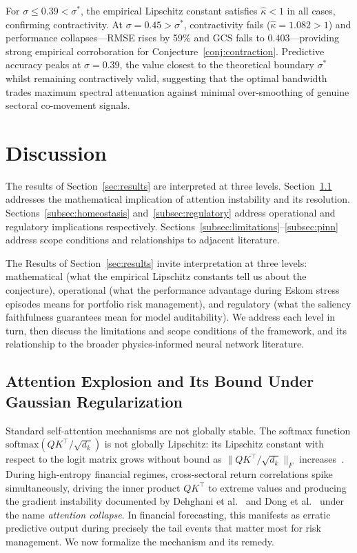 \documentclass[11pt,a4paper]{article}  %
\theoremstyle{plain}
\theoremstyle{definition}
\theoremstyle{remark}
\begin{document}
For $\sigma \leq 0.39 < \sigma^*$, the empirical Lipschitz constant
satisfies $\hat{\kappa} < 1$ in all cases, confirming contractivity.
At $\sigma = 0.45 > \sigma^*$, contractivity fails ($\hat{\kappa} =
1.082 > 1$) and performance collapses---RMSE rises by 59\% and GCS
falls to $0.403$---providing strong empirical corroboration for
Conjecture~\ref{conj:contraction}. Predictive accuracy peaks at
$\sigma = 0.39$, the value closest to the theoretical boundary
$\sigma^*$ whilst remaining contractively valid, suggesting that
the optimal bandwidth trades maximum spectral attenuation against
minimal over-smoothing of genuine sectoral co-movement signals.


\section{Discussion}
\label{sec:discussion}

The results of Section~\ref{sec:results} are interpreted at three
levels. Section~\ref{subsec:fallacy} addresses the mathematical
implication of attention instability and its resolution.
Sections~\ref{subsec:homeostasis} and~\ref{subsec:regulatory}
address operational and regulatory implications respectively.
Sections~\ref{subsec:limitations}--\ref{subsec:pinn} address
scope conditions and relationships to adjacent literature.

The Results of Section~\ref{sec:results} invite interpretation
at three levels: mathematical (what the empirical Lipschitz
constants tell us about the conjecture), operational (what the
performance advantage during Eskom stress episodes means for
portfolio risk management), and regulatory (what the saliency
faithfulness guarantees mean for model auditability). We address
each level in turn, then discuss the limitations and scope
conditions of the framework, and its relationship to the broader
physics-informed neural network literature.

\subsection{Attention Explosion and Its Bound Under Gaussian Regularization}
\label{subsec:fallacy}

Standard self-attention mechanisms are not globally stable. The
softmax function $\mathrm{softmax}(QK^{\top}/\sqrt{d_k})$ is not
globally Lipschitz: its Lipschitz constant with respect to the logit
matrix grows without bound as $\|\!QK^{\top}/\!\sqrt{d_k}\!\|_F$
increases~\cite{Gao2017}. During high-entropy financial regimes,
cross-sectoral return correlations spike simultaneously, driving the
inner product $QK^{\top}$ to extreme values and producing the
gradient instability documented by Dehghani et al.~\cite{Dehghani2023}
and Dong et al.~\cite{Dong2021} under the name
\emph{attention collapse}. In financial forecasting, this manifests as erratic
predictive output during precisely the tail events that matter most
for risk management. We now formalize the mechanism and its remedy.
\end{document}

